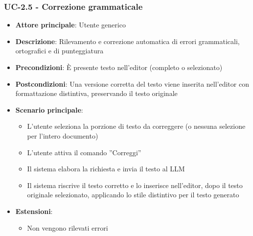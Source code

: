 \documentclass[11pt,a4paper]{article}
\begin{document}
\subsubsection{UC-2.5 - Correzione grammaticale}
\begin{itemize}
    \item \textbf{Attore principale}: Utente generico
    \item \textbf{Descrizione}: Rilevamento e correzione automatica di errori grammaticali, ortografici e di punteggiatura
    \item \textbf{Precondizioni}: È presente testo nell’editor (completo o selezionato)
    \item \textbf{Postcondizioni}: Una versione corretta del testo viene inserita nell’editor con formattazione distintiva, preservando il testo originale
    \item \textbf{Scenario principale}:
    \begin{itemize}
        \item L’utente seleziona la porzione di testo da correggere (o nessuna selezione per l'intero documento)
        \item L’utente attiva il comando ”Correggi”
        \item Il sistema elabora la richiesta e invia il testo al LLM
        \item Il sistema riscrive il testo corretto e lo inserisce nell'editor, dopo il testo originale selezionato, applicando lo stile distintivo per il testo generato
    \end{itemize}
    \item \textbf{Estensioni}:
    \begin{itemize}
        \item Non vengono rilevati errori
    \end{itemize}
\end{itemize}
\end{document}
